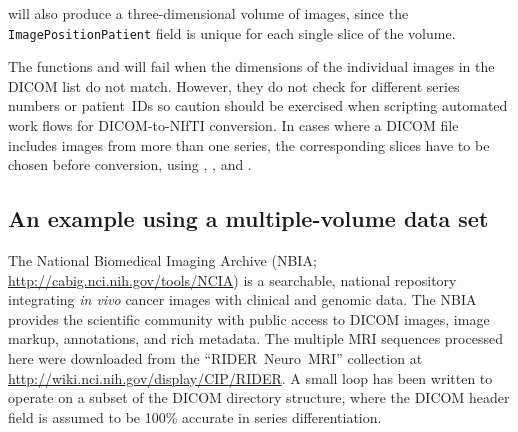 \documentclass[article,nojss,shortnames]{jss}
\begin{document}
will also produce a three-dimensional volume of images, since the
\texttt{ImagePositionPatient} field is unique for each single slice of
the volume.

The functions  and  will fail
when the dimensions of the individual images in the DICOM list do not
match.  However, they do not check for different series numbers or
patient~IDs so caution should be exercised when scripting automated
work flows for DICOM-to-NIfTI conversion.  In cases where a DICOM file
includes images from more than one series, the corresponding slices
have to be chosen before conversion, using ,
, and .

\subsection{An example using a multiple-volume data set}

The National Biomedical Imaging Archive (NBIA;
\url{http://cabig.nci.nih.gov/tools/NCIA}) is a searchable, national
repository integrating \emph{in vivo} cancer images with clinical and
genomic data.  The NBIA provides the scientific community with public
access to DICOM images, image markup, annotations, and rich metadata.
The multiple MRI sequences processed here were downloaded from the
``RIDER~Neuro~MRI'' collection at
\url{http://wiki.nci.nih.gov/display/CIP/RIDER}.  A small 
loop has been written to operate on a subset of the DICOM directory
structure, where the  DICOM header field is
assumed to be 100\% accurate in series differentiation.

\begin{Schunk}
\end{Schunk}
\end{document}
